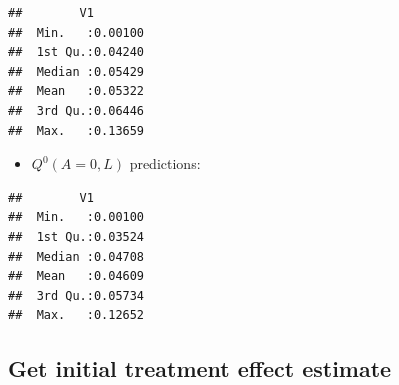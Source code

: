 \documentclass[
]{book}
\newenvironment{Shaded}{\begin{snugshade}}{\end{snugshade}}
\newcommand{\AttributeTok}[1]{\textcolor[rgb]{0.77,0.63,0.00}{#1}}
\newcommand{\DecValTok}[1]{\textcolor[rgb]{0.00,0.00,0.81}{#1}}
\newcommand{\FunctionTok}[1]{\textcolor[rgb]{0.00,0.00,0.00}{#1}}
\newcommand{\NormalTok}[1]{#1}
\newcommand{\OtherTok}[1]{\textcolor[rgb]{0.56,0.35,0.01}{#1}}
\newcommand{\SpecialCharTok}[1]{\textcolor[rgb]{0.00,0.00,0.00}{#1}}
\newcommand{\StringTok}[1]{\textcolor[rgb]{0.31,0.60,0.02}{#1}}
\providecommand{\tightlist}{%
  \setlength{\itemsep}{0pt}\setlength{\parskip}{0pt}}
\begin{document}
\begin{verbatim}
##        V1         
##  Min.   :0.00100  
##  1st Qu.:0.04240  
##  Median :0.05429  
##  Mean   :0.05322  
##  3rd Qu.:0.06446  
##  Max.   :0.13659
\end{verbatim}

\begin{itemize}
\tightlist
\item
  \(Q^0(A=0,L)\) predictions:
\end{itemize}

\begin{Shaded}
\end{Shaded}

\begin{verbatim}
##        V1         
##  Min.   :0.00100  
##  1st Qu.:0.03524  
##  Median :0.04708  
##  Mean   :0.04609  
##  3rd Qu.:0.05734  
##  Max.   :0.12652
\end{verbatim}

\hypertarget{get-initial-treatment-effect-estimate}{%
\subsection{Get initial treatment effect estimate}\label{get-initial-treatment-effect-estimate}}

\begin{Shaded}
\end{Shaded}

\begin{Shaded}
\end{Shaded}
\end{document}
